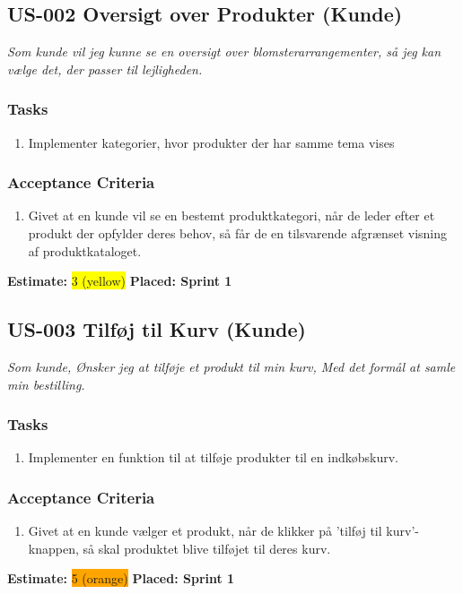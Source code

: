 \subsection{US-002 Oversigt over Produkter (Kunde)}
\label{sec:US-002}
\textit{Som kunde vil jeg kunne se en oversigt over blomsterarrangementer, så jeg kan vælge det, der passer til lejligheden.}
\subsubsection*{\textbf{Tasks}}
\begin{enumerate}
  \item Implementer kategorier, hvor produkter der har samme tema vises
\end{enumerate}
\subsubsection*{\textbf{Acceptance Criteria}}
\begin{enumerate}
  \item Givet at en kunde vil se en bestemt produktkategori, når de leder efter et produkt der opfylder deres behov, så får de en tilsvarende afgrænset visning af produktkataloget.
\end{enumerate}
\textbf{Estimate:} \colorbox{yellow}{3 (yellow)}
\textbf{Placed: Sprint 1}
\par\noindent\dotfill

\subsection{US-003 Tilføj til Kurv (Kunde)}
\label{sec:US-003}
\textit{Som kunde, Ønsker jeg at tilføje et produkt til min kurv, Med det formål at samle min bestilling.}
\subsubsection*{\textbf{Tasks}}
\begin{enumerate}
  \item Implementer en funktion til at tilføje produkter til en indkøbskurv.
\end{enumerate}
\subsubsection*{\textbf{Acceptance Criteria}}
\begin{enumerate}
  \item Givet at en kunde vælger et produkt, når de klikker på 'tilføj til kurv'-knappen, så skal produktet blive tilføjet til deres kurv.
\end{enumerate}
\textbf{Estimate:} \colorbox{orange}{5 (orange)}
\textbf{Placed: Sprint 1}
\par\noindent\dotfill

